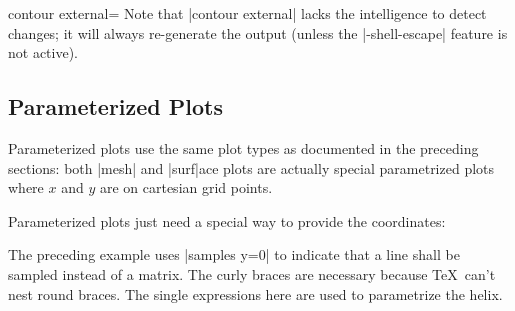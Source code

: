 {{\begin{plottype}[/pgfplots]{contour external=\textcolor{black}{}}
	Note that |contour external| lacks the intelligence to detect changes; it will always re-generate the output (unless the |-shell-escape| feature is not active).
\end{plottype}

% 
% 

}

\subsection{Parameterized Plots}
{%
%
Parameterized plots use the same plot types as documented in the preceding sections: both |mesh| and |surf|ace plots are actually special parametrized plots where $x$ and $y$ are on cartesian grid points.

Parameterized plots just need a special way to provide the coordinates:

\pgfplotsexpensiveexample
\begin{codeexample}[]
\end{codeexample}
\noindent The preceding example uses |samples y=0| to indicate that a line shall be sampled instead of a matrix. The curly braces are necessary because \TeX\ can't nest round braces. The single expressions here are used to parametrize the helix.

}}
